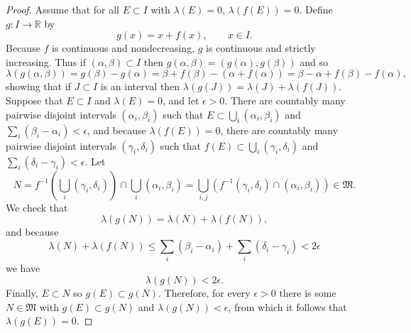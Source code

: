\documentclass{article}
\theoremstyle{definition}
\theoremstyle{definition}
\begin{document}
\begin{proof}
Assume that for all $E \subset I$ with $\lambda(E)=0$, $\lambda(f(E))=0$. Define $g:I \to \mathbb{R}$ by
\[
g(x)=x+f(x), \qquad x \in I.
\]
Because $f$ is continuous and nondecreasing, $g$ is continuous and strictly increasing. Thus if $(\alpha,\beta) \subset I$ then
$g(\alpha,\beta)=(g(\alpha),g(\beta))$ and so
\[
\lambda(g(\alpha,\beta))=g(\beta)-g(\alpha) = \beta+f(\beta)-(\alpha+f(\alpha))
=\beta-\alpha+f(\beta)-f(\alpha),
\]
showing that if $J \subset I$ is an interval then $\lambda(g(J)) = \lambda(J)+\lambda(f(J))$.
Suppose that $E \subset I$ and $\lambda(E)=0$, and let $\epsilon>0$. There are countably many pairwise disjoint intervals
$(\alpha_i,\beta_i)$ such that $E \subset \bigcup_i (\alpha_i,\beta_i)$ and $\sum_i (\beta_i-\alpha_i)<\epsilon$,
and because $\lambda(f(E))=0$, there are countably many pairwise disjoint intervals
$(\gamma_i,\delta_i)$ such that $f(E) \subset \bigcup_i (\gamma_i,\delta_i)$ and 
$\sum_i (\delta_i-\gamma_i)<\epsilon$. Let
\[
N=f^{-1}\left( \bigcup_i (\gamma_i,\delta_i) \right) \cap \bigcup_i (\alpha_i,\beta_i)
=\bigcup_{i,j} (f^{-1}(\gamma_i,\delta_i) \cap (\alpha_i,\beta_i)) \in \mathfrak{M}.
\]
We check that 
\[
\lambda(g(N)) = \lambda(N)+\lambda(f(N)),
\]
and because
\[
 \lambda(N)+\lambda(f(N)) \leq \sum_i (\beta_i-\alpha_i)+\sum_i (\delta_i-\gamma_i)<2\epsilon
\]
we have
\[
\lambda(g(N)) < 2\epsilon.
\]
Finally, $E \subset N$ so $g(E) \subset g(N)$.
Therefore, for every $\epsilon>0$ there is some $N \in \mathfrak{M}$ with 
$g(E) \subset g(N)$ and $\lambda(g(N))<\epsilon$, from which it follows that $\lambda(g(E))=0$.


\end{proof}
\end{document}
